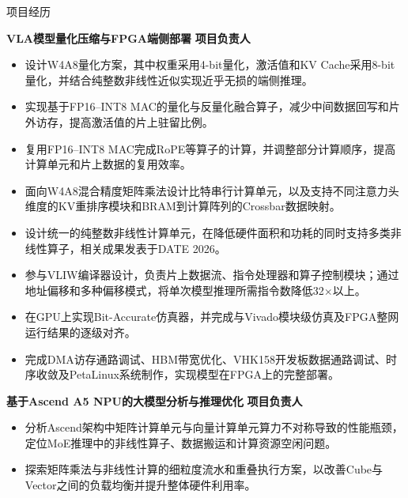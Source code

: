 \documentclass{resume}
\begin{document}

\begin{rSection}{项目经历}

\textbf{VLA模型量化压缩与FPGA端侧部署}
\hfill
\textbf{项目负责人}

\begin{itemize}
    \item 设计W4A8量化方案，其中权重采用4-bit量化，激活值和KV Cache采用8-bit量化，并结合纯整数非线性近似实现近乎无损的端侧推理。
    \item 实现基于FP16--INT8 MAC的量化与反量化融合算子，减少中间数据回写和片外访存，提高激活值的片上驻留比例。
    \item 复用FP16--INT8 MAC完成RoPE等算子的计算，并调整部分计算顺序，提高计算单元和片上数据的复用效率。
    \item 面向W4A8混合精度矩阵乘法设计比特串行计算单元，以及支持不同注意力头维度的KV重排序模块和BRAM到计算阵列的Crossbar数据映射。
    \item 设计统一的纯整数非线性计算单元，在降低硬件面积和功耗的同时支持多类非线性算子，相关成果发表于DATE 2026。
    \item 参与VLIW编译器设计，负责片上数据流、指令处理器和算子控制模块；通过地址偏移和多种偏移模式，将单次模型推理所需指令数降低32$\times$以上。
    \item 在GPU上实现Bit-Accurate仿真器，并完成与Vivado模块级仿真及FPGA整网运行结果的逐级对齐。
    \item 完成DMA访存通路调试、HBM带宽优化、VHK158开发板数据通路调试、时序收敛及PetaLinux系统制作，实现模型在FPGA上的完整部署。
\end{itemize}

\vspace{3pt}

\textbf{基于Ascend A5 NPU的大模型分析与推理优化}
\hfill
\textbf{项目负责人}

\begin{itemize}
    \item 分析Ascend架构中矩阵计算单元与向量计算单元算力不对称导致的性能瓶颈，定位MoE推理中的非线性算子、数据搬运和计算资源空闲问题。
    \item 探索矩阵乘法与非线性计算的细粒度流水和重叠执行方案，以改善Cube与Vector之间的负载均衡并提升整体硬件利用率。
\end{itemize}

\end{rSection}
\end{document}
